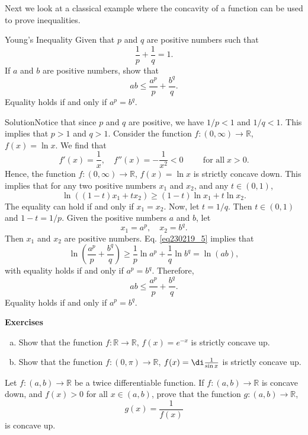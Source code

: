 \begin{example}{}
Next we look at a classical example where the concavity of a function can be used to prove inequalities.
\begin{example}{Young's Inequality}
Given that $p$ and $q$ are positive numbers such that
\[\frac{1}{p}+\frac{1}{q}=1.\]If $a$ and $b$ are positive numbers, show that 
\[ab\leq \frac{a^p}{p}+\frac{b^q}{q}.\]Equality holds if and only if $a^p=b^q$.
\end{example}
\begin{solution}{Solution}Notice that since $p$ and $q$ are positive, we have $1/p<1$ and $1/q<1$. This implies that $p>1$ and $q>1$.
Consider the function $f:(0,\infty)\to\mathbb{R}$, $f(x)=\ln x$. We find that
\[f'(x)=\frac{1}{x},\quad f''(x)=-\frac{1}{x^2}<0\hspace{1cm}\text{for all}\; x>0.\]  Hence, the function $f:(0,\infty)\to\mathbb{R}$, $f(x)=\ln x$ is strictly concave down. 
This implies that for any two   positive numbers $x_1$ and $x_2$, and any $t\in (0,1)$, 
\begin{equation}\label{eq230219_5}\ln \left((1-t)x_1+tx_2\right)\geq (1-t)\ln x_1+t\ln x_2.\end{equation} The equality can hold if and only if $x_1=x_2$.   Now, let
$t=1/q$.
Then $t\in (0,1)$ and $1-t=1/p$. Given the positive numbers $a$ and $b$, let
\[x_1=a^p, \quad x_2=b^q.\]
 Then $x_1$ and $x_2$ are positive numbers. Eq. \eqref{eq230219_5} implies that
\[\ln \left(\frac{a^p}{p}+\frac{b^q}{q}\right)\geq \frac{1}{p}\ln a^p+\frac{1}{q}\ln b^q=\ln (ab),\]\bs with equality holds if and only if $a^p=b^q$. Therefore,
\[ab\leq \frac{a^p}{p}+\frac{b^q}{q}.\]Equality holds if and only if $a^p=b^q$.
\end{solution}

\vp
\noindent
{\bf \large Exercises  \thesection}
\setcounter{myquestion}{1}
\begin{question}{\themyquestion}
\begin{enumerate}[(a)]
\item Show that the function $f:\mathbb{R}\to \mathbb{R}$, $f(x)=e^{-x}$ is strictly concave up.
\item Show that the function $f:(0,\pi)\to \mathbb{R}$, $f(x)=\di\frac{1}{\sin x}$ is strictly concave up.
\end{enumerate}
\end{question}


 \atc
\begin{question}{\themyquestion}
Let $f:(a,b)\to\mathbb{R}$ be a twice differentiable function. If $f:(a,b)\to\mathbb{R}$ is concave down, and $f(x)>0$ for all $x\in (a, b)$, prove that the function $g:(a,b)\to\mathbb{R}$,
\[g(x)=\frac{1}{f(x)}\] is concave up.
\end{question}


\end{example}
